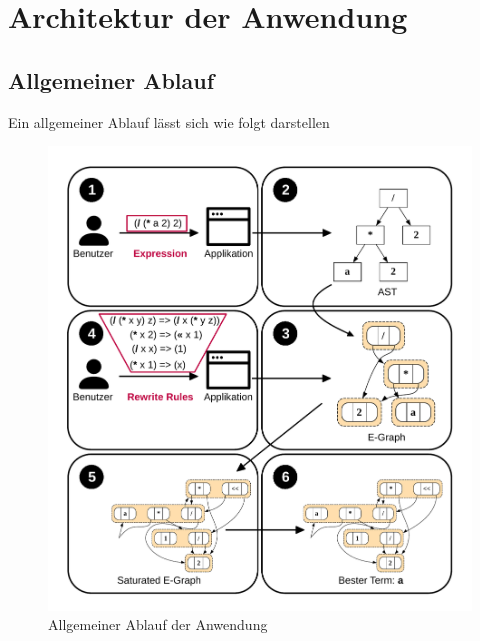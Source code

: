 \section{Architektur der Anwendung}\label{sec:architektur}

\subsection{Allgemeiner Ablauf}

Ein allgemeiner Ablauf lässt sich wie folgt darstellen

\begin{figure}[H]
  \includegraphics[width=\textwidth]{../fig/ablauf.pdf}
  \caption{Allgemeiner Ablauf der Anwendung}
  \label{fig:ablauf}
\end{figure}